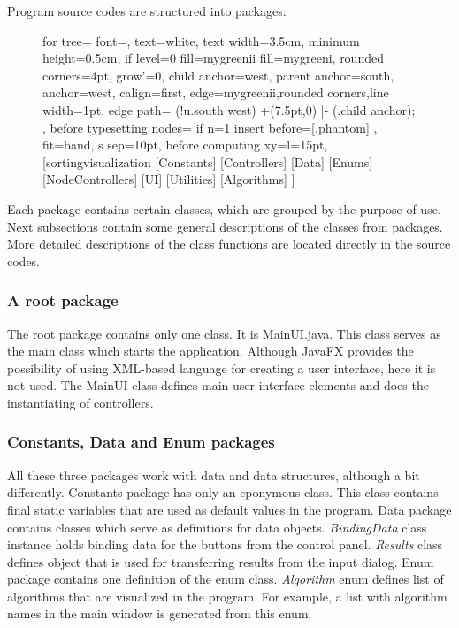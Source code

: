 \documentclass[
  field=inf,
  biblatex,
  language=english,
  glossaries,
  theorems=false,
  sourcecodes=false,
  index
]{kidiplom}
\begin{document}
Program source codes are structured into packages:
\begin{figure}[H]
	\begin{flushleft}
		\begin{forest}
			for tree={
    		font=\sffamily,
    		text=white,
    		text width=3.5cm,
    		minimum height=0.5cm,
    		if level=0
    		  {fill=mygreenii}
    		  {fill=mygreeni},
    		rounded corners=4pt,
    		grow'=0,
    		child anchor=west,
    		parent anchor=south,
    		anchor=west,
    		calign=first,
    		edge={mygreenii,rounded corners,line width=1pt},
    		edge path={
    		  \noexpand{}
    		  (!u.south west) +(7.5pt,0) |- (.child anchor);
		    },
    		before typesetting nodes={
      		if n=1
        		{insert before={[,phantom]}}
        		{}
    		},
    		fit=band,
    		s sep=10pt,
    		before computing xy={l=15pt},
  		}
		[sortingvisualization
		  [Constants]
  		  [Controllers]
		  [Data]
		  [Enums]
		  [NodeControllers]
		  [UI]
		  [Utilities]
		  [Algorithms]
		]
		\end{forest}
	\end{flushleft}
\end{figure}

Each package contains certain classes, which are grouped by the purpose of use. Next subsections contain some general descriptions of the classes from packages. More detailed descriptions of the class functions are located directly in the source codes.
\subsubsection{A root package}
The root package contains only one class. It is MainUI.java. This class serves as the main class which starts the application. Although JavaFX provides the possibility of using XML-based language for creating a user interface, here it is not used. The MainUI class defines main user interface elements and does the instantiating of controllers.

\subsubsection{Constants, Data and Enum packages}
All these three packages work with data and data structures, although a bit differently. Constants package has only an eponymous class. This class contains final static variables that are used as default values in the program. Data package contains classes which serve as definitions for data objects. \textit{BindingData} class instance holds binding data for the buttons from the control panel. \textit{Results} class defines object that is used for transferring results from the input dialog. Enum package contains one definition of the enum class. \textit{Algorithm} enum defines list of algorithms that are visualized in the program. For example, a list with algorithm names in the main window is generated from this enum.
\end{document}
